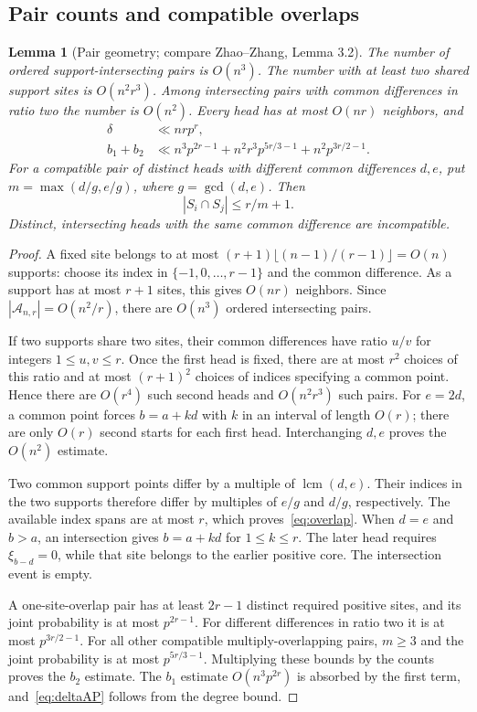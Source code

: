 \documentclass[11pt]{article}
\newtheorem{lemma}[theorem]{Lemma}
\theoremstyle{definition}\newtheorem{definition}[theorem]{Definition}
\theoremstyle{remark}\newtheorem{remark}[theorem]{Remark}
\newcommand{\AP}{\mathcal A}
\begin{document}
\subsection{Pair counts and compatible overlaps}
\begin{lemma}[Pair geometry; compare Zhao--Zhang, Lemma 3.2]\label{lem:pairs}
The number of ordered support-intersecting pairs is $O(n^3)$.
The number with at least two shared support sites is $O(n^2r^3)$.
Among intersecting pairs with common differences in ratio two the number
is $O(n^2)$. Every head has at most $O(nr)$ neighbors, and
\begin{align}
 \delta&\ll nrp^r,\label{eq:deltaAP}\\
 b_1+b_2&\ll n^3p^{2r-1}
        +n^2r^3p^{5r/3-1}+n^2p^{3r/2-1}.
        \label{eq:pairbound}
\end{align}
For a compatible pair of distinct heads with different common differences
$d,e$, put $m=\max(d/g,e/g)$, where $g=\gcd(d,e)$. Then
\begin{equation}
 |S_i\cap S_j|\le r/m+1.\label{eq:overlap}
\end{equation}
Distinct, intersecting heads with the same common difference are
incompatible.
\end{lemma}
\begin{proof}
A fixed site belongs to at most
$(r+1)\lfloor(n-1)/(r-1)\rfloor=O(n)$ supports: choose its index in
$\{-1,0,\ldots,r-1\}$ and the common difference. As a support has at
most $r+1$ sites, this gives $O(nr)$ neighbors. Since
$|\AP_{n,r}|=O(n^2/r)$, there are $O(n^3)$ ordered intersecting pairs.

If two supports share two sites, their common differences have ratio
$u/v$ for integers $1\le u,v\le r$. Once the first head is fixed,
there are at most $r^2$ choices of this ratio and at most $(r+1)^2$
choices of indices specifying a common point. Hence there are
$O(r^4)$ such second heads and $O(n^2r^3)$ such pairs.
For $e=2d$, a common point forces $b=a+kd$ with $k$ in an interval
of length $O(r)$; there are only $O(r)$ second starts for each first
head. Interchanging $d,e$ proves the $O(n^2)$ estimate.

Two common support points differ by a multiple of $\operatorname{lcm}(d,e)$.
Their indices in the two supports therefore differ by multiples of
$e/g$ and $d/g$, respectively. The available index spans are at most $r$,
which proves~\eqref{eq:overlap}.
When $d=e$ and $b>a$, an intersection gives $b=a+kd$ for
$1\le k\le r$. The later head requires $\xi_{b-d}=0$, while that site
belongs to the earlier positive core. The intersection event is empty.

A one-site-overlap pair has at least $2r-1$ distinct required positive
sites, and its joint probability is at most $p^{2r-1}$. For different
differences in ratio two it is at most $p^{3r/2-1}$. For all other
compatible multiply-overlapping pairs, $m\ge3$ and the joint probability
is at most $p^{5r/3-1}$. Multiplying these bounds by the counts proves the
$b_2$ estimate. The $b_1$ estimate $O(n^3p^{2r})$ is absorbed by the
first term, and~\eqref{eq:deltaAP} follows from the degree bound.
\end{proof}
\end{document}
